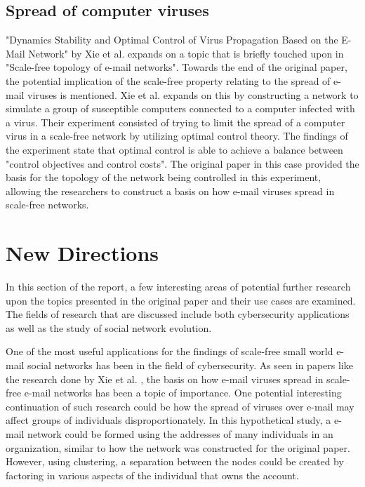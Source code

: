\documentclass[11pt]{article}
\begin{document}
\begin{multicols}{2}
\subsection{Spread of computer viruses}
\hspace*{\parindent}"Dynamics Stability and Optimal Control of Virus Propagation Based on the E-Mail Network" by Xie et al. \cite{5} expands on a topic that is briefly touched upon in "Scale-free topology of e-mail networks". Towards the end of the original paper, the potential implication of the scale-free property relating to the spread of e-mail viruses is mentioned. Xie et al. expands on this by constructing a network to simulate a group of susceptible computers connected to a computer infected with a virus. Their experiment consisted of trying to limit the spread of a computer virus in a scale-free network by utilizing optimal control theory. The findings of the experiment state that optimal control is able to achieve a balance between "control objectives and control costs". The original paper in this case provided the basis for the topology of the network being controlled in this experiment, allowing the researchers to construct a basis on how e-mail viruses spread in scale-free networks. 


\section{New Directions}
\hspace*{\parindent}In this section of the report, a few interesting areas of potential further research upon the topics presented in the original paper and their use cases are examined. The fields of research that are discussed include both cybersecurity applications as well as the study of social network evolution.

One of the most useful applications for the findings of scale-free small world e-mail social networks has been in the field of cybersecurity. As seen in papers like the research done by Xie et al. \cite{5}, the basis on how e-mail viruses spread in scale-free e-mail networks has been a topic of importance. One potential interesting continuation of such research could be how the spread of viruses over e-mail may affect groups of individuals disproportionately. In this hypothetical study, a e-mail network could be formed using the addresses of many individuals in an organization, similar to how the network was constructed for the original paper. However, using clustering, a separation between the nodes could be created by factoring in various aspects of the individual that owns the account. 


\end{multicols}
\end{document}
